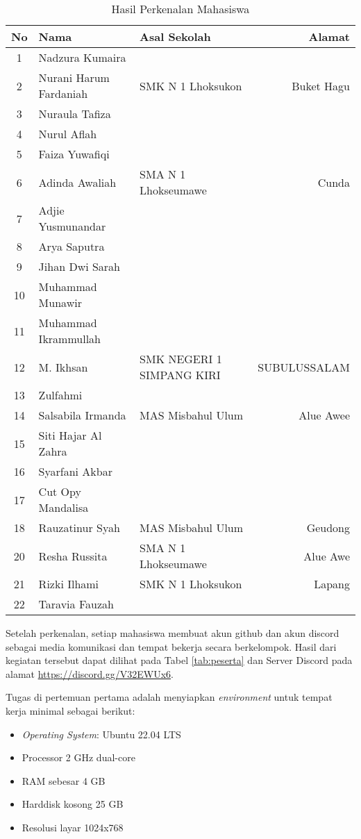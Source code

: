 \documentclass[a4paper]{tufte-handout}
\begin{document}
\begin{table}[!ht]
\caption{Hasil Perkenalan Mahasiswa}
\label{tab:perkenalan}
\centering
\begin{tabular}{cllr} 
\toprule
No & Nama 	&	Asal Sekolah 	&	Alamat\\
\midrule
1 & Nadzura Kumaira			& & \\
2 & Nurani Harum Fardaniah	& SMK N 1 Lhoksukon & Buket Hagu \\
3 & Nuraula Tafiza			& & \\
4 & Nurul Aflah				& & \\
5 & Faiza Yuwafiqi			& & \\
6 & Adinda Awaliah			& SMA N 1 Lhokseumawe & Cunda \\
7 & Adjie Yusmunandar		& & \\
8 & Arya Saputra			& & \\
9 & Jihan Dwi Sarah			& & \\
10 & Muhammad Munawir		& & \\
11 & Muhammad Ikrammullah	& & \\
\midrule
12 & M. Ikhsan				&SMK NEGERI 1 SIMPANG KIRI &SUBULUSSALAM \\
13 & Zulfahmi				& & \\
14 & Salsabila Irmanda		& MAS Misbahul Ulum & Alue Awee \\
15 & Siti Hajar Al Zahra	& & \\
16 & Syarfani Akbar			& & \\
17 & Cut Opy Mandalisa		& & \\
18 & Rauzatinur Syah		    & MAS Misbahul Ulum & Geudong \\
20 & Resha Russita			& SMA N 1 Lhokseumawe & Alue Awe \\
21 & Rizki Ilhami			& SMK N 1 Lhoksukon & Lapang \\
22 & Taravia Fauzah			& & \\
\bottomrule
\end{tabular}
\end{table}

Setelah perkenalan, setiap mahasiswa membuat akun github dan akun discord sebagai media komunikasi dan tempat bekerja secara berkelompok. Hasil dari kegiatan tersebut dapat dilihat pada Tabel \ref{tab:peserta} dan Server Discord pada alamat \url{https://discord.gg/V32EWUx6}.

Tugas di pertemuan pertama adalah menyiapkan \textit{environment} untuk tempat kerja minimal sebagai berikut:
\begin{itemize}
\setlength\itemsep{0em}
\item \textit{Operating System}: Ubuntu 22.04 LTS
\item Processor 2 GHz dual-core
\item RAM sebesar 4 GB
\item Harddisk kosong 25 GB
\item Resolusi layar 1024x768
\end{itemize}
\hrulefill
\end{document}
